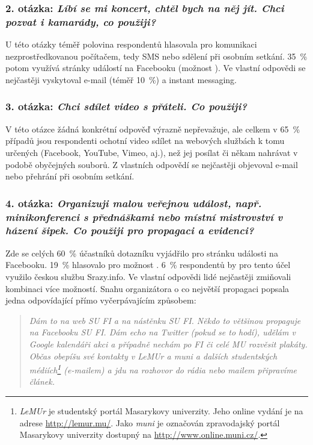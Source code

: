 \documentclass[12pt,oneside,final]{fithesis2}
\begin{document}
\subsubsection*{\textbf{2. otázka:} \emph{Líbí se mi koncert, chtěl bych na něj jít. Chci pozvat i kamarády, co použiji?}}
U této otázky téměř polovina respondentů hlasovala pro komunikaci nezprostředkovanou počítačem, tedy SMS nebo sdělení při osobním setkání. 35~\% potom využívá stránky událostí na Facebooku (možnost ). Ve vlastní odpovědi se nejčastěji vyskytoval e-mail (téměř 10~\%) a instant messaging.

\subsubsection*{\textbf{3. otázka:} \emph{Chci sdílet video s přáteli. Co použiji?}}
V této otázce žádná konkrétní odpověď výrazně nepřevažuje, ale celkem v 65~\% případů jsou respondenti ochotní video sdílet na webových službách k tomu určených (Facebook, YouTube, Vimeo, aj.), než jej posílat či někam nahrávat v podobě obyčejných souborů. Z vlastních odpovědí se nejčastěji objevoval e-mail nebo přehrání při osobním setkání.

\subsubsection*{\textbf{4. otázka:} \emph{Organizuji malou veřejnou událost, např. minikonferenci s přednáškami nebo místní mistrovství v házení šipek. Co použiji pro propagaci a evidenci?}}\label{propagationOfEventQuote}
Zde se celých 60~\% účastníků dotazníku vyjádřilo pro stránku události na Facebooku. 19~\% hlasovalo pro možnost . 6~\% respondentů by pro tento účel využilo českou službu Srazy.info. Ve vlastní odpovědi lidé nejčastěji zmiňovali kombinaci více možností. Snahu organizátora o co největší propagaci popsala jedna odpovídající přímo vyčerpávajícím způsobem:

\begin{quotation}
    \emph{Dám to na web SU FI a na nástěnku SU FI. Někdo to většinou propaguje na Facebooku SU FI. Dám echo na Twitter (pokud se to hodí), udělám v Google kalendáři akci a případně nechám po FI či celé MU rozvěsit plakáty. Občas obepíšu své kontakty v LeMUr a muni a dalších studentských médiích\footnote{\emph{LeMUr} je studentský portál Masarykovy univerzity. Jeho online vydání je na adrese \url{http://lemur.mu/}. Jako \emph{muni} je označován zpravodajský portál Masarykovy univerzity dostupný na \url{http://www.online.muni.cz/}.} (e-mailem) a jdu na rozhovor do rádia nebo mailem připravíme článek.}
\end{quotation}
\end{document}
